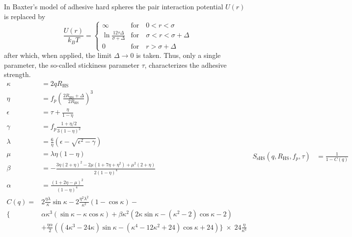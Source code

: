 In Baxter's model \cite{Baxter1968,Robertus1989,Kruif1989,Barboy1974,Menon1991,Menon1991a}
of adhesive hard spheres the pair interaction potential $U(r)$ is replaced by
\begin{equation}
\frac{U(r)}{k_BT} =
 \begin{cases}
      \infty    & \text{for} \quad 0<r<\sigma \\
      \ln\frac{12\tau\Delta}{\sigma+\Delta} & \text{for} \quad \sigma<r<\sigma+\Delta \\
      0         & \text{for} \quad r>\sigma+\Delta
   \end{cases}
\end{equation}
after which, when applied, the limit $\Delta \to 0$ is taken.
Thus, only a single parameter, the so-called stickiness parameter
$\tau$, characterizes the adhesive strength.
\begin{subequations}
\begin{align}
\kappa &= 2 q R_\text{HS} \\
\eta &= f_p \left(\frac{2R_\text{HS}+\Delta}{2R_\text{HS}}\right)^3\\
\epsilon &= \tau+\frac{\eta}{1-\eta} \\
\gamma &= f_p\frac{1+\eta/2}{3\left(1-\eta\right)^2} \\
\lambda &= \frac{6}{\eta} \left(\epsilon-\sqrt{\epsilon^2-\gamma}\right) \label{eq:sHS_lambda}\\
\mu &= \lambda \eta (1-\eta) \\
\beta &= -\frac{3\eta \left(2+\eta\right)^2-2\mu \left(1+7\eta+\eta^2\right)+\mu^2(2+\eta)}{2\left(1-\eta\right)^4}\\
\alpha &= \frac{\left(1+2\eta-\mu\right)^2}{\left(1-\eta\right)^4}\\[5mm]
C(q) = & 2\frac{\eta\lambda}{\kappa}\sin\kappa
        -2\frac{\eta^2\lambda^2}{\kappa^2}\left(1-\cos\kappa\right) -\\
   \Big\{ & \alpha\kappa^3(\sin\kappa-\kappa\cos\kappa)
           +\beta\kappa^2(2\kappa\sin\kappa-(\kappa^2-2)\cos\kappa-2)\nonumber\\
          & +\frac{\eta\alpha}{2}\left((4\kappa^3-24\kappa)\sin\kappa-(\kappa^4-12\kappa^2+24)\cos\kappa+24\right)
             \Big\} \;\times\;24\frac{\eta}{\kappa^6}\nonumber
\end{align}
\begin{align}
   S_\text{sHS}(q,R_\text{HS},f_p,\tau) & = \frac{1}{1-C(q)}
\end{align}
\end{subequations}

